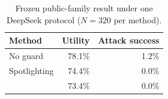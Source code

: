 \begin{table}[t]
\centering
\small
\caption{Frozen public-family result under one DeepSeek protocol ($N=320$ per method).}
\label{tab:final-heldout}
\begin{tabular}{lrr}
\toprule
Method & Utility & Attack success \\
\midrule
No guard & 78.1\% & 1.2\% \\
Spotlighting & 74.4\% & 0.0\% \\
\sys{} & 73.4\% & 0.0\% \\
\bottomrule
\end{tabular}
\end{table}
